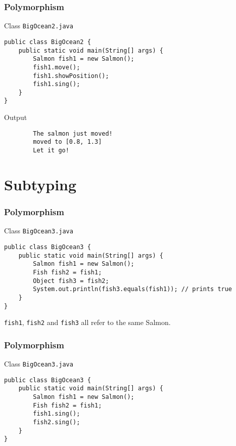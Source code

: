 \documentclass[10pt, compress]{beamer}
\begin{document}
\begin{frame}[fragile]
	\frametitle{Polymorphism}
	\begin{block}{Class \texttt{BigOcean2.java}}
		\begin{verbatim}
public class BigOcean2 {
	public static void main(String[] args) {
		Salmon fish1 = new Salmon();
		fish1.move();
		fish1.showPosition();
		fish1.sing();
	}
}
		\end{verbatim}
	\end{block}
	\begin{block}{Output}
		\begin{verbatim}
		The salmon just moved!
		moved to [0.8, 1.3]
		Let it go!
		\end{verbatim}
	\end{block}
\end{frame}

\section{Subtyping}

\begin{frame}[fragile]
	\frametitle{Polymorphism}
	\begin{block}{Class \texttt{BigOcean3.java}}
		\begin{verbatim}
public class BigOcean3 {
	public static void main(String[] args) {
		Salmon fish1 = new Salmon();
		Fish fish2 = fish1;
		Object fish3 = fish2;
		System.out.println(fish3.equals(fish1)); // prints true
	}
}
		\end{verbatim}
	\texttt{fish1}, \texttt{fish2} and \texttt{fish3} all refer to the same Salmon.
	\end{block}
\end{frame}

\begin{frame}[fragile]
	\frametitle{Polymorphism}
	\begin{block}{Class \texttt{BigOcean3.java}}
		\begin{verbatim}
public class BigOcean3 {
	public static void main(String[] args) {
		Salmon fish1 = new Salmon();
		Fish fish2 = fish1;
		fish1.sing();
		fish2.sing();
	}
}
		\end{verbatim}
	\end{block}
\end{frame}
\end{document}
